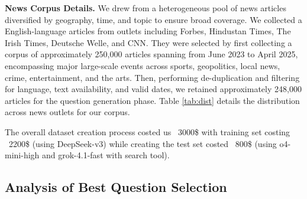 \documentclass{article} %
\begin{document}
\begin{table}
\vspace{-0.4cm}
\caption{Breakdown of source news articles by news outlet.}
\vspace{-0.25cm}
\vspace{-0.3cm}
\label{tab:dist}
\end{table}
\textbf{News Corpus Details.} We drew from a heterogeneous pool of news articles diversified by geography, time, and topic to ensure broad coverage. We collected a English-language articles from outlets including Forbes, Hindustan Times, The Irish Times, Deutsche Welle, and CNN. They were selected by first collecting a corpus of approximately 250,000 articles spanning from June 2023 to April 2025, encompassing major large-scale events across sports, geopolitics, local news, crime, entertainment, and the arts. Then, performing de-duplication and filtering for language, text availability, and valid dates, we retained approximately 248,000 articles for the question generation phase. Table \ref{tab:dist} details the distribution across news outlets for our corpus. 


The overall dataset creation process costed us ~3000\$ with training set costing ~2200\$ (using DeepSeek-v3) while creating the test set costed ~800\$ (using o4-mini-high and grok-4.1-fast with search tool). 


\vspace{0.15cm}

\subsection{Analysis of Best Question Selection}
\end{document}
